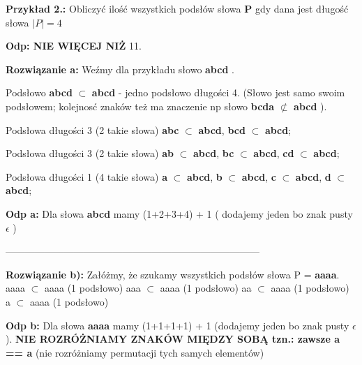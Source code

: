 		
		\begin{tcolorbox}
			\textbf{Przykład 2.: } \newline 
			Obliczyć ilość wszystkich podsłów słowa  
			\textbf{P} gdy dana jest długość słowa $\mid P \mid = 4$ \newline 
			
			\textbf{Odp: NIE WIĘCEJ NIŻ} 11. \newline \newline

			\textbf{Rozwiązanie a:}\newline
			Weźmy dla przykładu słowo {\bf abcd }. 
			
			Podsłowo {\bf abcd} $\subset$ {\bf abcd} - jedno podsłowo długości 4. 
			(Słowo jest samo swoim podsłowem; kolejnosć znaków też ma znaczenie np słowo 
			{\bf bcda} $\not\subset $ {\bf abcd}  ).
			\newline
			
			Podsłowa długości 3 (2 takie słowa)
			{\bf abc} $\subset$ {\bf abcd},
			{\bf bcd} $\subset$ {\bf abcd};
			
			Podsłowa długości 3 (2 takie słowa)
			{\bf ab} $\subset$ {\bf abcd},
			{\bf bc} $\subset$ {\bf abcd},
			{\bf cd} $\subset$ {\bf abcd};
			
			Podsłowa długości 1 (4 takie słowa)
			{\bf a} $\subset$ {\bf abcd},
			{\bf b} $\subset$ {\bf abcd},
			{\bf c} $\subset$ {\bf abcd},
			{\bf d} $\subset$ {\bf abcd}; \newline
							
			\textbf{Odp a:} \newline
			Dla słowa \textbf{abcd} mamy (1+2+3+4) + 1 \newline
			( dodajemy jeden bo znak pusty $\epsilon$ ) \newline
			
			------------------------------------------------------------------------------\newline
			
			\textbf{Rozwiązanie b):} \newline
			Załóżmy, że szukamy wszystkich podsłów słowa P = {\bf aaaa}. \newline
			aaaa $\subset$  aaaa (1 podsłowo) \newline
			aaa $\subset$  aaaa (1 podsłowo) \newline
			aa $\subset$  aaaa (1 podsłowo) \newline
			a $\subset$  aaaa (1 podsłowo)  \newline
			
			\textbf{Odp b:} \newline
			Dla słowa { \bf aaaa} mamy (1+1+1+1) + 1 (dodajemy jeden bo znak 
			pusty $\epsilon$ ).\newline 
			 \textbf{NIE ROZRÓŻNIAMY ZNAKÓW MIĘDZY SOBĄ tzn.: zawsze a == a} 
			(nie rozróżniamy permutacji tych samych elementów)
			
		\end{tcolorbox}
	
